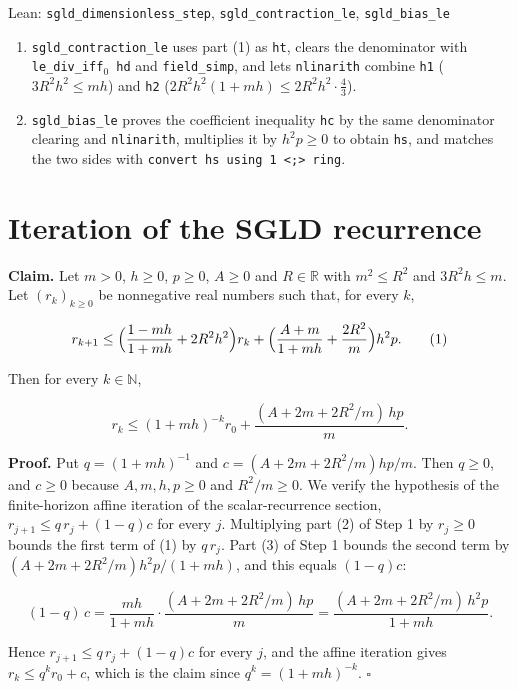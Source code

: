 \documentclass[11pt,a4paper]{article}
\begin{document}
\begin{leanbox}{Lean: \texttt{sgld\_\allowbreak{}dimensionless\_\allowbreak{}step}, \texttt{sgld\_\allowbreak{}contraction\_\allowbreak{}le}, \texttt{sgld\_\allowbreak{}bias\_\allowbreak{}le}}
\begin{enumerate}
\item \texttt{sgld\_\allowbreak{}contraction\_\allowbreak{}le} uses part (1) as \texttt{ht}, clears the denominator with \texttt{le\_\allowbreak{}div\_\allowbreak{}iff\ensuremath{{}_{0}} hd} and \texttt{field\_\allowbreak{}simp}, and lets \texttt{nlinarith} combine \texttt{h1} (\(3R^2h^2\le mh\)) and \texttt{h2} (\(2R^2h^2(1+mh)\le2R^2h^2\cdot\frac43\)).

\item \texttt{sgld\_\allowbreak{}bias\_\allowbreak{}le} proves the coefficient inequality \texttt{hc} by the same denominator clearing and \texttt{nlinarith}, multiplies it by \(h^2p\ge0\) to obtain \texttt{hs}, and matches the two sides with \texttt{convert hs using 1 <;> ring}.

\end{enumerate}
\end{leanbox}

\section{\texorpdfstring{Iteration of the SGLD recurrence}{Iteration of the SGLD recurrence}}


\textbf{Claim.} Let \(m>0\), \(h\ge0\), \(p\ge0\), \(A\ge0\) and \(R\in\mathbb R\) with \(m^2\le R^2\) and \(3R^2h\le m\). Let \((r_k)_{k\ge0}\) be nonnegative real numbers such that, for every \(k\),


\[r_{k+1}\le\Bigl(\frac{1-mh}{1+mh}+2R^2h^2\Bigr)r_k+\Bigl(\frac{A+m}{1+mh}+\frac{2R^2}m\Bigr)h^2p.\qquad(1)\]


Then for every \(k\in\mathbb N\),


\[r_k\le(1+mh)^{-k}r_0+\frac{(A+2m+2R^2/m)\,hp}m.\]


\textbf{Proof.} Put \(q=(1+mh)^{-1}\) and \(c=(A+2m+2R^2/m)hp/m\). Then \(q\ge0\), and \(c\ge0\) because \(A,m,h,p\ge0\) and \(R^2/m\ge0\). We verify the hypothesis of the finite-horizon affine iteration of the scalar-recurrence section, \(r_{j+1}\le q\,r_j+(1-q)c\) for every \(j\). Multiplying part (2) of Step 1 by \(r_j\ge0\) bounds the first term of (1) by \(q\,r_j\). Part (3) of Step 1 bounds the second term by \((A+2m+2R^2/m)h^2p/(1+mh)\), and this equals \((1-q)c\):


\[(1-q)\,c=\frac{mh}{1+mh}\cdot\frac{(A+2m+2R^2/m)\,hp}m=\frac{(A+2m+2R^2/m)\,h^2p}{1+mh}.\]


Hence \(r_{j+1}\le q\,r_j+(1-q)c\) for every \(j\), and the affine iteration gives \(r_k\le q^kr_0+c\), which is the claim since \(q^k=(1+mh)^{-k}\). \(\square\)
\end{document}
